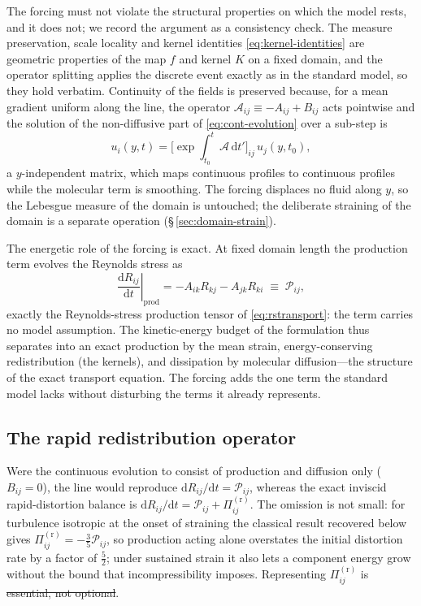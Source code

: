 \documentclass[lineno]{JFM-FLM_Au}
\providecommand{\DIFadd}[1]{{\protect\color{blue}\uwave{#1}}} %
\providecommand{\DIFdel}[1]{{\protect\color{red}\sout{#1}}} %
\providecommand{\DIFaddbegin}{} %
\providecommand{\DIFaddend}{} %
\providecommand{\DIFdelbegin}{} %
\providecommand{\DIFdelend}{} %
\begin{document}
The forcing must not violate the structural properties on which the
model rests, and it does not; we record the argument as a consistency
check. The measure preservation, scale locality and kernel identities
\eqref{eq:kernel-identities} are geometric properties of the map $f$ and
kernel $K$ on a fixed domain, and the operator splitting applies the
discrete event exactly as in the standard model, so they hold verbatim.
Continuity of the fields is preserved because, for a mean gradient
uniform along the line, the operator
$\mathcal{A}_{ij}\equiv-A_{ij}+B_{ij}$ acts pointwise and the solution of
the non-diffusive part of \eqref{eq:cont-evolution} over a sub-step is
\begin{equation}
  u_i(y,t)=\big[\exp\!\textstyle\int_{t_0}^{t}
           \mathcal{A}\,\mathrm{d}t'\big]_{ij}\,u_j(y,t_0),
  \label{eq:matrixexp}
\end{equation}
a $y$-independent matrix, which maps continuous profiles to continuous
profiles while the molecular term is smoothing. The forcing displaces no
fluid along $y$, so the Lebesgue measure of the domain is untouched; the
deliberate straining of the domain is a separate operation
(\S\,\ref{sec:domain-strain}).

The energetic role of the forcing is exact. At fixed domain length the
production term evolves the Reynolds stress as
\begin{equation}
  \left.\frac{\mathrm{d}R_{ij}}{\mathrm{d}t}\right|_{\text{prod}}
  = -A_{ik}R_{kj}-A_{jk}R_{ki}
  \;\equiv\; \mathcal{P}_{ij},
  \label{eq:production-rate}
\end{equation}
exactly the Reynolds-stress production tensor of \eqref{eq:rstransport}:
the term carries no model assumption. The kinetic-energy budget of the
formulation thus separates into an exact production by the mean strain,
energy-conserving redistribution (the kernels), and dissipation by
molecular diffusion---the structure of the exact transport equation. The
forcing adds the one term the standard model lacks without disturbing the
terms it already represents.

\subsection{The rapid redistribution operator}\label{sec:rapid-kernel}

Were the continuous evolution to consist of production and diffusion only
($B_{ij}=0$), the line would reproduce
$\mathrm{d}R_{ij}/\mathrm{d}t=\mathcal{P}_{ij}$, whereas the exact
inviscid rapid-distortion balance is
$\mathrm{d}R_{ij}/\mathrm{d}t=\mathcal{P}_{ij}+\Pi^{(\mathrm r)}_{ij}$.
The omission is not small: for turbulence isotropic at the onset of
straining the classical result recovered below gives
$\Pi^{(\mathrm r)}_{ij}=-\tfrac35\mathcal{P}_{ij}$, so production acting
alone overstates the initial distortion rate by a factor of $\tfrac52$;
under sustained strain it also lets a component energy grow without the
bound that incompressibility imposes. Representing
$\Pi^{(\mathrm r)}_{ij}$ is \DIFdelbegin \DIFdel{essential, not optional}\DIFdelend \DIFaddbegin \DIFadd{necessary}\DIFaddend .
\end{document}
